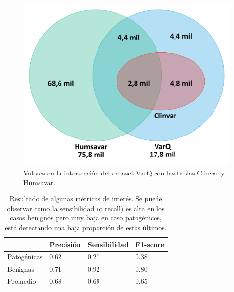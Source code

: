 \begin{figure}[h]
    \centering
    \includegraphics[scale=0.4]{documents/latex/figures/3/interseccion_varq.png}
    \caption{Valores en la intersección del dataset VarQ con las tablas Clinvar y Humsavar.}
    \label{fig:interseccion_varq}
\end{figure}

\begin{table}[H]
\centering
\begin{tabular}{|l|l|l|l|}
\hline
              & Precisión & Sensibilidad & F1-score \\ \hline
Patogénicas   & 0.62      & 0.27   & 0.38     \\ \hline
Benignas      & 0.71      & 0.92   & 0.80     \\ \hline
Promedio      & 0.68      & 0.69   & 0.65     \\ \hline   
\end{tabular}
\caption{Resultado de algunas métricas de interés. Se puede observar como la sensibilidad (o recall) es alta en los casos benignos pero muy baja en caso patogénicos, está detectando una baja proporción de estos últimos.}

\label{fig:metrics_varq}
\end{table}

